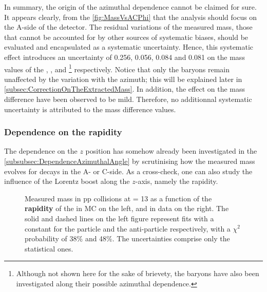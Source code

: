 In summary, the origin of the azimuthal dependence cannot be claimed for sure. It appears clearly, from the \figs\ref{fig:MassVsACPhi} that the analysis should focus on the A-side of the detector. The residual variations of the measured mass, those that cannot be accounted for by other sources of systematic biases, should be evaluated and encapsulated as a systematic uncertainty. Hence, this systematic effect introduces an uncertainty of 0.256, 0.056, 0.084 and 0.081 \mmass on the mass values of the \rmKzeroS, \rmLambdaPM, \rmOmegaM and \rmAomegaP\footnote{Although not shown here for the sake of brievety, the \rmOmegaPM baryons have also been investigated along their possible azimuthal dependence.} respectively. Notice that only the \rmXi baryons remain  unaffected by the variation with the azimuth; this will be explained later in \Sec\ref{subsec:CorrectionOnTheExtractedMass}. In addition, the effect on the mass difference have been observed to be mild. Therefore, no additionnal systematic uncertainty is attributed to the mass difference values.

\subsubsection{Dependence on the rapidity}
\label{subsubsec:RapidityDependence}

The dependence on the $z$ position has somehow already been investigated in the \Sec\ref{subsubsec:DependenceAzimuthalAngle} by scrutinising how the measured mass evolves for decays in the A- or C-side. As a cross-check, one can also study the influence of the Lorentz boost along the $z$-axis, namely the rapidity.

\begin{figure}[h]
\hspace*{-1.5cm}
\caption{Measured mass in pp collisions at \sqrtS = 13 \tev as a function of the \textbf{rapidity} of the \rmLambda in MC on the left, and in data on the right. The solid and dashed lines on the left figure represent fits with a constant for the particle and the anti-particle respectively, with a $\chi^{2}$ probability of 38\% and 48\%. The uncertainties comprise only the statistical ones.}
	\label{fig:MassVsRap}
\end{figure}


